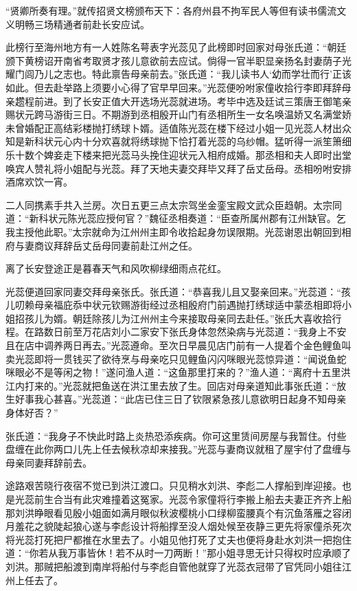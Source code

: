 \documentclass[12pt,UTF8]{ctexbook}
\begin{document}
“贤卿所奏有理。”就传招贤文榜颁布天下：各府州县不拘军民人等但有读书儒流文义明畅三场精通者前赴长安应试。

此榜行至海州地方有一人姓陈名萼表字光蕊见了此榜即时回家对母张氏道：“朝廷颁下黄榜诏开南省考取贤才孩儿意欲前去应试。倘得一官半职显亲扬名封妻荫子光耀门闾乃儿之志也。特此禀告母亲前去。”张氏道：“我儿读书人‘幼而学壮而行’正该如此。但去赴举路上须要小心得了官早早回来。”光蕊便吩咐家僮收拾行李即拜辞母亲趱程前进。到了长安正值大开选场光蕊就进场。考毕中选及廷试三策唐王御笔亲赐状元跨马游街三日。不期游到丞相殷开山门有丞相所生一女名唤温娇又名满堂娇未曾婚配正高结彩楼抛打绣球卜婿。适值陈光蕊在楼下经过小姐一见光蕊人材出众知是新科状元心内十分欢喜就将绣球抛下恰打着光蕊的乌纱帽。猛听得一派笙箫细乐十数个婢妾走下楼来把光蕊马头挽住迎状元入相府成婚。那丞相和夫人即时出堂唤宾人赞礼将小姐配与光蕊。拜了天地夫妻交拜毕又拜了岳丈岳母。丞相吩咐安排酒席欢饮一宵。

二人同携素手共入兰房。次日五更三点太宗驾坐金銮宝殿文武众臣趋朝。太宗同道：“新科状元陈光蕊应授何官？”魏征丞相奏道：“臣查所属州郡有江州缺官。乞我主授他此职。”太宗就命为江州州主即令收拾起身勿误限期。光蕊谢恩出朝回到相府与妻商议拜辞岳丈岳母同妻前赴江州之任。

离了长安登途正是暮春天气和风吹柳绿细雨点花红。

光蕊便道回家同妻交拜母亲张氏。张氏道：“恭喜我儿且又娶亲回来。”光蕊道：“孩儿叨赖母亲福庇忝中状元钦赐游街经过丞相殷府门前遇抛打绣球适中蒙丞相即将小姐招孩儿为婿。朝廷除孩儿为江州州主今来接取母亲同去赴任。”张氏大喜收拾行程。在路数日前至万花店刘小二家安下张氏身体忽然染病与光蕊道：“我身上不安且在店中调养两日再去。”光蕊遵命。至次日早晨见店门前有一人提着个金色鲤鱼叫卖光蕊即将一贯钱买了欲待烹与母亲吃只见鲤鱼闪闪咪眼光蕊惊异道：“闻说鱼蛇咪眼必不是等闲之物！”遂问渔人道：“这鱼那里打来的？”渔人道：“离府十五里洪江内打来的。”光蕊就把鱼送在洪江里去放了生。回店对母亲道知此事张氏道：“放生好事我心甚喜。”光蕊道：“此店已住三日了钦限紧急孩儿意欲明日起身不知母亲身体好否？”

张氏道：“我身子不快此时路上炎热恐添疾病。你可这里赁间房屋与我暂住。付些盘缠在此你两口儿先上任去候秋凉却来接我。”光蕊与妻商议就租了屋宇付了盘缠与母亲同妻拜辞前去。

途路艰苦晓行夜宿不觉已到洪江渡口。只见稍水刘洪、李彪二人撑船到岸迎接。也是光蕊前生合当有此灾难撞着这冤家。光蕊令家僮将行李搬上船去夫妻正齐齐上船那刘洪睁眼看见殷小姐面如满月眼似秋波樱桃小口绿柳蛮腰真个有沉鱼落雁之容闭月羞花之貌陡起狼心遂与李彪设计将船撑至没人烟处候至夜静三更先将家僮杀死次将光蕊打死把尸都推在水里去了。小姐见他打死了丈夫也便将身赴水刘洪一把抱住道：“你若从我万事皆休！若不从时一刀两断！”那小姐寻思无计只得权时应承顺了刘洪。那贼把船渡到南岸将船付与李彪自管他就穿了光蕊衣冠带了官凭同小姐往江州上任去了。
\end{document}
